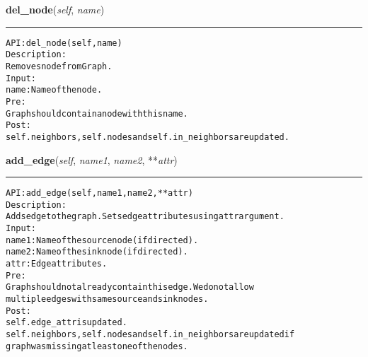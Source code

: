     \label{coinor:gimpy:graph:Graph:del_node}

    \vspace{0.5ex}

\hspace{.8\funcindent}\begin{boxedminipage}{\funcwidth}

    \raggedright \textbf{del\_node}(\textit{self}, \textit{name})

    \vspace{-1.5ex}

    \rule{\textwidth}{0.5\fboxrule}
\setlength{\parskip}{2ex}
\begin{alltt}

API: del\_node(self, name)
Description:
Removes node from Graph.
Input:
    name: Name of the node.
Pre:
    Graph should contain a node with this name.
Post:
    self.neighbors, self.nodes and self.in\_neighbors are updated.
\end{alltt}

\setlength{\parskip}{1ex}
    \end{boxedminipage}

    \label{coinor:gimpy:graph:Graph:add_edge}

    \vspace{0.5ex}

\hspace{.8\funcindent}\begin{boxedminipage}{\funcwidth}

    \raggedright \textbf{add\_edge}(\textit{self}, \textit{name1}, \textit{name2}, **\textit{attr})

    \vspace{-1.5ex}

    \rule{\textwidth}{0.5\fboxrule}
\setlength{\parskip}{2ex}
\begin{alltt}

API: add\_edge(self, name1, name2, **attr)
Description:
Adds edge to the graph. Sets edge attributes using attr argument.
Input:
    name1: Name of the source node (if directed).
    name2: Name of the sink node (if directed).
    attr: Edge attributes.
Pre:
    Graph should not already contain this edge. We do not allow
    multiple edges with same source and sink nodes.
Post:
    self.edge\_attr is updated.
    self.neighbors, self.nodes and self.in\_neighbors are updated if
    graph was missing at least one of the nodes.
\end{alltt}

\setlength{\parskip}{1ex}
    \end{boxedminipage}

